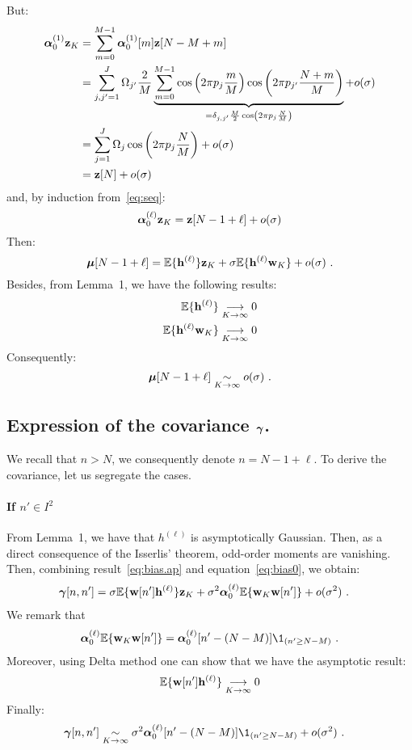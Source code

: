 \documentclass[journal, onecolumn]{IEEEtran}
\begin{document}
But:
\begin{align*}
\boldsymbol{\alpha}_0^{(1)}{\mathbf z}_{K} &=\sum_{m=0}^{M-1}\boldsymbol{\alpha}_0^{(1)}[m]{\mathbf z}[N-M+m] \\
&=\sum_{j,j'=1}^J\Omega_{j'}\dfrac{2}{M}\underbrace{\sum_{m=0}^{M-1}\cos\left(2\pi p_j\frac{m}{M}\right)\cos\left(2\pi p_{j'}\dfrac{N+m}{M}\right)}_{=\delta_{j,j'}\frac{M}2\cos\left(2\pi p_j\frac{N}M\right)} + o(\sigma) \\
&= \sum_{j=1}^J\Omega_j\cos\left(2\pi p_j\dfrac{N}{M}\right) + o(\sigma) \\
&= {\mathbf z}[N] + o(\sigma)
\end{align*}
and, by induction from~\eqref{eq:seq}:
\begin{equation}
\label{eq:alpha0z.sine}
\balpha_0^{(\ell)}\bz_{K} = \bz[N-1+\ell] + o(\sigma)
\end{equation}
Then:
\begin{equation*}
\boldsymbol{\mu}[N-1+\ell] = {\mathbb E}\{{\mathbf h}^{(\ell)}\}{\mathbf z}_{K} + \sigma{\mathbb E}\{{\mathbf h}^{(\ell)}{\mathbf w}_{K}\} + o(\sigma)\ .
\end{equation*}
Besides, from Lemma~1, we have the following results:
\begin{align*}
{\mathbb E}\{{\mathbf h}^{(\ell)}\} &\underset{K\to\infty}{\longrightarrow} 0\\
{\mathbb E}\{{\mathbf h}^{(\ell)}{\mathbf w}_{K}\} &\underset{K\to\infty}{\longrightarrow} 0
\end{align*}
Consequently:
\begin{equation*}
\bmu[N-1+\ell] \underset{K\to\infty}{\sim} o(\sigma)\ .
\label{eq:bias.ap}
\end{equation*}


\subsection{Expression of the covariance $\boldsymbol{\gamma}$.}
We recall that $n>N$, we consequently denote $n=N-1+\ell$.  To derive the covariance, let us segregate the cases. 
 
\paragraph{If $n'\in I^2$}
From Lemma~1, we have that $h^{(\ell)}$ is asymptotically Gaussian. Then, as a direct consequence of the Isserlis' theorem, odd-order moments are vanishing. Then, combining result~\eqref{eq:bias.ap} and equation~\eqref{eq:bias0}, we obtain:
\begin{align*}
\boldsymbol{\gamma}[n,n'] &= \sigma{\mathbb E}\{{\mathbf w}[n']{\mathbf h}^{(\ell)}\}{\mathbf z}_K + \sigma^2\boldsymbol{\alpha}_0^{(\ell)}{\mathbb E}\{{\mathbf w}_K{\mathbf w}[n']\} + o(\sigma^2) \ .
\end{align*}
We remark that
\[
\balpha_0^{(\ell)}\EE\{\bw_K\bw[n']\}=\balpha_0^{(\ell)}[n'-(N-M)]\1_{(n'\geq N-M)}\ .
\]
Moreover, using Delta method one can show that we have the asymptotic result:
\begin{equation}
\EE\{\bw[n']\bh^{(\ell)}\} \underset{K\to\infty}{\longrightarrow} 0
\label{eq:cov.ap}
\end{equation}
Finally:
\begin{align*}
\bgamma[n,n'] &\underset{K\to\infty}{\sim} \sigma^2\balpha_0^{(\ell)}[n'-(N-M)]\1_{(n'\geq N-M)} + o(\sigma^2) \ .
\end{align*}
\end{document}
